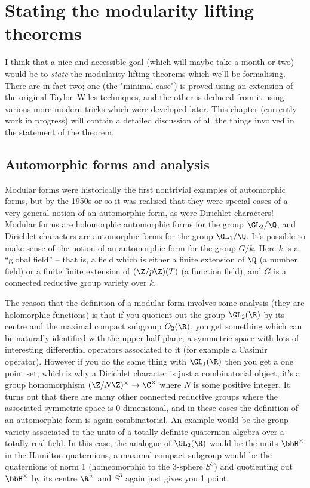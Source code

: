 \chapter{Stating the modularity lifting theorems}

I think that a nice and accessible goal (which will maybe take a month or two) would be to \emph{state} the modularity lifting theorems which we'll be formalising. There are in fact two; one (the "minimal case") is proved using an extension of the original Taylor--Wiles techniques, and the other is deduced from it using various more modern tricks which were developed later. This chapter (currently work in progress) will contain a detailed discussion of all the things involved in the statement of the theorem.

\section{Automorphic forms and analysis}

Modular forms were historically the first nontrivial examples of automorphic forms, but by the 1950s or so it was realised that they were special cases of a very general notion of an automorphic form, as were Dirichlet characters! Modular forms are holomorphic automorphic forms for the group $\GL_2/\Q$, and Dirichlet characters are automorphic forms for the group $\GL_1/\Q$. It's possible to make sense of the notion of an automorphic form for the group $G/k$. Here $k$ is a ``global field'' -- that is, a field which is either a finite extension of $\Q$ (a number field) or a finite finite extension of $(\Z/p\Z)(T)$ (a function field), and $G$ is a connected reductive group variety over $k$. 

The reason that the definition of a modular form involves some analysis (they are holomorphic functions) is that if you quotient out the group $\GL_2(\R)$ by its centre and the maximal compact subgroup $O_2(\R)$, you get something which can be naturally identified with the upper half plane, a symmetric space with lots of interesting differential operators associated to it (for example a Casimir operator). However if you do the same thing with $\GL_1(\R)$ then you get a one point set, which is why a Dirichlet character is just a combinatorial object; it's a group homomorphism $(\Z/N\Z)^\times\to\C^\times$ where $N$ is some positive integer. It turns out that there are many other connected reductive groups where the associated symmetric space is 0-dimensional, and in these cases the definition of an automorphic form is again combinatorial. An example would be the group variety associated to the units of a totally definite quaternion algebra over a totally real field. In this case, the analogue of $\GL_2(\R)$ would be the units $\bbH^\times$ in the Hamilton quaternions, a maximal compact subgroup would be the quaternions of norm 1 (homeomorphic to the 3-sphere $S^3$) and quotienting out $\bbH^\times$ by its centre $\R^\times$ and $S^3$ again just gives you 1 point. 

